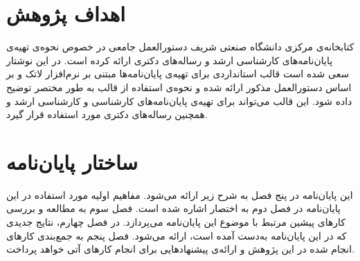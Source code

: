 \section{اهداف پژوهش}

کتابخانه‌ی مرکزی دانشگاه صنعتی شریف دستورالعمل جامعی در خصوص
نحوه‌ی تهیه‌ی پایان‌نامه‌ها‌ی کارشناسی ارشد و رساله‌های دکتری ارائه کرده است.
در این نوشتار سعی شده است قالب استانداردی برای تهیه‌ی پایان‌نامه‌ها مبتنی بر نرم‌افزار لاتک و
بر اساس دستورالعمل مذکور ارائه شده و
نحوه‌ی استفاده از قالب به طور مختصر توضیح داده شود.
این قالب  می‌تواند برای تهیه‌ی پایان‌نامه‌های کارشناسی و کارشناسی ارشد 
و همچنین رساله‌ها‌ی دکتری مورد استفاده قرار گیرد.

\section{ساختار پایان‌نامه}

این پایان‌نامه در پنج فصل به شرح زیر ارائه می‌شود.
مفاهیم اولیه مورد استفاده در این پایان‌نامه در فصل دوم به اختصار اشاره شده است. 
فصل سوم به مطالعه و بررسی کارهای پیشین مرتبط با موضوع این پایان‌نامه می‌پردازد.
در فصل چهارم، نتایج جدیدی که در این پایان‌نامه به‌دست آمده است، ارائه می‌شود.
فصل پنجم به جمع‌بندی کارهای انجام شده در این پژوهش و ارائه‌ی پیشنهادهایی برای انجام کارهای آتی خواهد پرداخت.